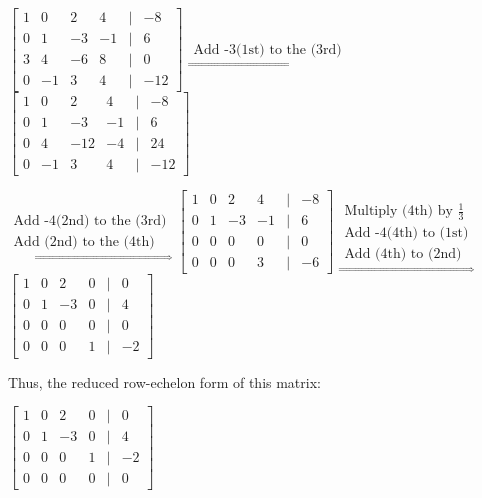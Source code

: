     \begin{tbox}
        \small
        $\begin{bmatrix}
            1 & 0 & 2 & 4 & | & -8 \\
            0 & 1 & -3 & -1 & | & 6 \\
            3 & 4 & -6 & 8 & | & 0 \\
            0 & -1 & 3 & 4 & | & -12
        \end{bmatrix}$
        \normalsize
        $\underset{\Rightarrow}{\substack{\text{Add -3(1st) to the (3rd)}}}$
        \small
        $\begin{bmatrix}
            1 & 0 & 2 & 4 & | & -8 \\
            0 & 1 & -3 & -1 & | & 6 \\
            0 & 4 & -12 & -4 & | & 24 \\
            0 & -1 & 3 & 4 & | & -12
        \end{bmatrix}$

        \normalsize
        $\underset{\Rightarrow}{\substack{\text{Add -4(2nd) to the (3rd)}
                                        \\ \text{Add (2nd) to the (4th)}}}$
        \small
        $\begin{bmatrix}
            1 & 0 & 2 & 4 & | & -8 \\
            0 & 1 & -3 & -1 & | & 6 \\
            0 & 0 & 0 & 0 & | & 0 \\
            0 & 0 & 0 & 3 & | & -6
        \end{bmatrix}$
        \normalsize
        $\underset{\Rightarrow}{\substack{\text{Multiply (4th) by $\frac{1}{3}$}
                                        \\ \text{Add -4(4th) to (1st)}
                                        \\ \text{Add (4th) to (2nd)}}}$
        \small
        $\begin{bmatrix}
            1 & 0 & 2 & 0 & | & 0 \\
            0 & 1 & -3 & 0 & | & 4 \\
            0 & 0 & 0 & 0 & | & 0 \\
            0 & 0 & 0 & 1 & | & -2
        \end{bmatrix}$

        \normalsize
        Thus, the reduced row-echelon form of this matrix:

        \hspace{0.5cm}
        \small
        $\begin{bmatrix}
            1 & 0 & 2 & 0 & | & 0 \\
            0 & 1 & -3 & 0 & | & 4 \\
            0 & 0 & 0 & 1 & | & -2 \\
            0 & 0 & 0 & 0 & | & 0
        \end{bmatrix}$


\end{tbox}
